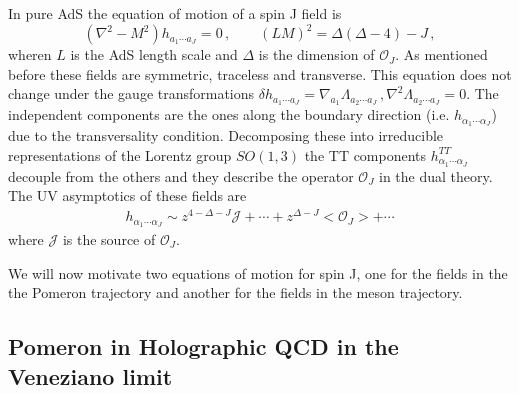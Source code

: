 \documentclass[a4paper,12pt]{article}
\begin{document}
In pure AdS the equation of motion of a spin J field is
\begin{equation}
\left( \nabla^2 - M^2 \right) h_{a_1 \cdots a_J} = 0 \, , \qquad {\left(LM\right)}^2 = \Delta \left(\Delta - 4 \right) - J \, , 
\label{eq:spin_J_eom_ads}
\end{equation}
wheren $L$ is the AdS length scale and $\Delta$ is the dimension of $\mathcal{O}_J$. As mentioned before these fields are symmetric, traceless and transverse. This equation does not change under the gauge transformations $\delta h_{a_1\cdots a_J} = \nabla_{a_1} \Lambda_{a_2 \cdots a_J}\, , \nabla^2 \Lambda_{a_2 \cdots a_J} = 0$. The independent components are the ones along the boundary direction (i.e. $h_{\alpha_1 \cdots \alpha_J}$) due to the transversality condition. Decomposing these into irreducible representations of the Lorentz group $SO(1,3)$ the TT components $h^{TT}_{\alpha_1 \cdots \alpha_J}$ decouple from the others and they describe the operator $\mathcal{O}_J$ in the dual theory. The UV asymptotics of these fields are
\begin{align}
h_{\alpha_1 \cdots \alpha_J} \sim z^{4 - \Delta - J} \mathcal{J} + \cdots + z^{\Delta - J} < \mathcal{O}_J > + \cdots
\end{align}
where $\mathcal{J}$ is the source of $\mathcal{O}_J$.

We will now motivate two equations of motion for spin J, one for the fields in the the Pomeron trajectory and another for the fields in the meson trajectory.
\subsection{Pomeron in Holographic QCD in the Veneziano limit}
\end{document}
